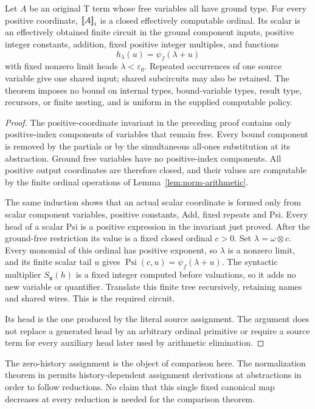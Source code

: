 \begin{theorem}
\label{thm:generated-source}
Let $A$ be an original T term whose free variables all have ground
type.  For every positive coordinate, $\mathopen{[\![}A\mathclose{]\!]}_i$ is a closed
effectively computable ordinal.  Its scalar is an effectively obtained
finite circuit in the ground component inputs, positive integer
constants, addition, fixed positive integer multiples, and functions
\[
 h_\lambda(u)=\psi_f(\lambda+u)
\]
with fixed nonzero limit heads $\lambda<\varepsilon_0$.
Repeated occurrences of one source variable give one shared input;
shared subcircuits may also be retained.  The theorem imposes no bound
on internal types, bound-variable types, result type, recursors, or
finite nesting, and is uniform in the supplied computable policy.
\end{theorem}
\begin{proof}
The positive-coordinate invariant in the preceding proof contains
only positive-index components of variables that remain free.
Every bound component is removed by the partials or by the simultaneous
all-ones substitution at its abstraction.  Ground free variables have
no positive-index components.  All positive output coordinates are
therefore closed, and their values are computable by the finite ordinal
operations of Lemma~\ref{lem:norm-arithmetic}.

The same induction shows that an actual scalar coordinate is formed
only from scalar component variables, positive constants, Add,
fixed repeats and Psi.  Every head of a scalar Psi is a positive
expression in the invariant just proved.  After the ground-free
restriction its value is a fixed closed ordinal $c>0$.
Set $\lambda=\omega\otimes c$.  Every monomial of this ordinal
has positive exponent, so $\lambda$ is a nonzero limit, and its
finite scalar tail $u$ gives
$\operatorname{Psi}(c,u)=\psi_f(\lambda+u)$.
The syntactic multiplier $S_{\mathbf x}(h)$ is a fixed integer
computed before valuations, so it adds no new variable or quantifier.
Translate this finite tree recursively, retaining names and shared
wires.  This is the required circuit.

Its head is the one produced by the literal source assignment.
The argument does not replace a generated head by an arbitrary ordinal
primitive or require a source term for every auxiliary head later used
by arithmetic elimination.
\end{proof}

The zero-history assignment is the object of comparison here.  The
normalization theorem in \cite{ww} permits history-dependent assignment
derivations at abstractions in order to follow reductions.  No claim
that this single fixed canonical map decreases at every reduction is
needed for the comparison theorem.
